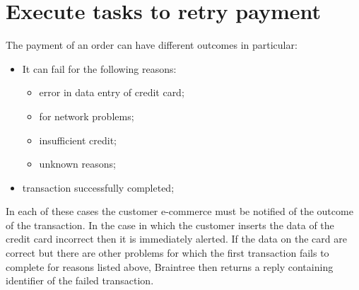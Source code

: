 \section{Execute tasks to retry payment}
\label{sec:tasks_to_retry_payment}
The payment of an order can have different outcomes in particular:
\begin{itemize}
\item It can fail for the following reasons:
\begin{itemize}
\item error in data entry of credit card;
\item for network problems;
\item insufficient credit;
\item unknown reasons;
\end{itemize}
\item transaction successfully completed;
\end{itemize}
In each of these cases the customer e-commerce must be notified of the outcome of the transaction.
In the case in which the customer inserts the data of the credit card incorrect then it is immediately alerted.
If the data on the card are correct but there are other problems for which the first transaction fails to complete for reasons listed above, Braintree then returns a reply containing identifier of the failed transaction.